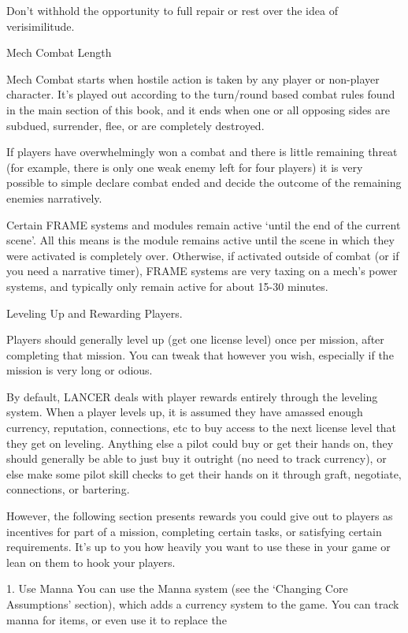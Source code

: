 Don’t withhold the opportunity to full repair or rest over the idea of verisimilitude.


                                          Mech Combat Length

Mech Combat starts when hostile action is taken by any player or non-player character. It’s
played out according to the turn/round based combat rules found in the main section of this
book, and it ends when one or all opposing sides are subdued, surrender, flee, or are completely
destroyed.


If players have overwhelmingly won a combat and there is little remaining threat (for example,
there is only one weak enemy left for four players) it is very possible to simple declare combat
ended and decide the outcome of the remaining enemies narratively.


Certain FRAME systems and modules remain active `until the end of the current scene'. All this
means is the module remains active until the scene in which they were activated is completely
over. Otherwise, if activated outside of combat (or if you need a narrative timer), FRAME systems
are very taxing on a mech’s power systems, and typically only remain active for about 15-30
minutes.


                                 Leveling Up and Rewarding Players.

Players should generally level up (get one license level) once per mission, after completing that
mission. You can tweak that however you wish, especially if the mission is very long or odious.


By default, LANCER deals with player rewards entirely through the leveling system. When a
player levels up, it is assumed they have amassed enough currency, reputation, connections, etc
to buy access to the next license level that they get on leveling. Anything else a pilot could buy
or get their hands on, they should generally be able to just buy it outright (no need to track
currency), or else make some pilot skill checks to get their hands on it through graft, negotiate,
connections, or bartering.


However, the following section presents rewards you could give out to players as incentives for
part of a mission, completing certain tasks, or satisfying certain requirements. It’s up to you how
heavily you want to use these in your game or lean on them to hook your players.


1. Use Manna
You can use the Manna system (see the `Changing Core Assumptions' section), which adds a %
currency system to the game. You can track manna for items, or even use it to replace the




